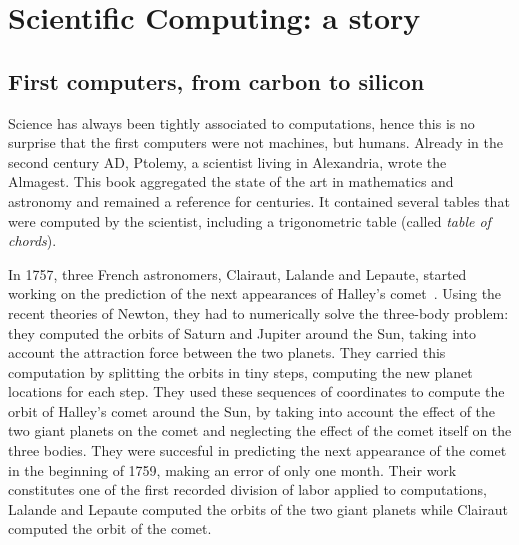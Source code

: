 \chapter{Scientific Computing: a story}
\label{chapter:context}

    \section{First computers, from carbon to silicon}%
    \label{sec:first_computers}

        Science has always been tightly associated to computations, hence this is no surprise that the first computers
        were not machines, but humans. Already in the second century AD, Ptolemy, a scientist living in Alexandria,
        wrote the Almagest. This book aggregated the state of the art in mathematics and astronomy and remained a
        reference for centuries. It contained several tables that were computed by the scientist, including a
        trigonometric table (called \emph{table of chords}).

        In 1757, three French astronomers, Clairaut, Lalande and Lepaute, started working on the prediction of the next
        appearances of Halley's comet~\cite[Chapter~1]{human_computers}. Using the recent theories of Newton, they had
        to numerically solve the three-body problem: they computed the orbits of Saturn and Jupiter around the Sun,
        taking into account the attraction force between the two planets. They carried this computation by splitting the
        orbits in tiny steps, computing the new planet locations for each step. They used these sequences of coordinates
        to compute the orbit of Halley's comet around the Sun, by taking into account the effect of the two giant
        planets on the comet and neglecting the effect of the comet itself on the three bodies. They were succesful in
        predicting the next appearance of the comet in the beginning of 1759, making an error of only one month. Their
        work constitutes one of the first recorded division of labor applied to computations, Lalande and Lepaute
        computed the orbits of the two giant planets while Clairaut computed the orbit of the comet.

